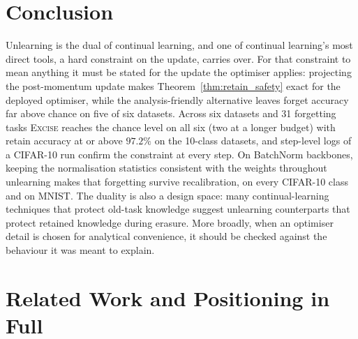 \documentclass{article}
\newcommand{\ours}{\textsc{Excise}}
\newcommand{\added}[1]{{\color{revised}#1}}
\newcommand{\rev}[1]{{\color{revisedB}#1}}
\theoremstyle{remark}
\theoremstyle{plain}
\begin{document}
\section{Conclusion}\label{sec:conclusion}

Unlearning is the dual of continual learning, and \rev{one of continual
learning's most direct tools, a hard constraint on the update, carries over}.
For that constraint to mean anything it must be stated for the update the
optimiser applies: projecting the post-momentum update makes
Theorem~\ref{thm:retain_safety} exact for the deployed optimiser, while the
analysis-friendly alternative \rev{leaves forget accuracy far above chance on
five of six datasets}. Across six datasets and 31 forgetting tasks \ours{}
reaches the chance level on all six (two at a longer budget) with retain
accuracy at or above $97.2\%$ on the 10-class datasets, and \rev{step-level logs
of a CIFAR-10 run} confirm the constraint at every step.
\added{On BatchNorm backbones, keeping the normalisation statistics consistent
with the weights throughout unlearning makes that forgetting survive
recalibration, on every CIFAR-10 class and on MNIST.} The duality is also a
design space: \rev{many continual-learning techniques that protect old-task
knowledge suggest unlearning counterparts} that protect retained knowledge
during erasure. More broadly, when an
optimiser detail is chosen for analytical convenience, it should be checked
against the behaviour it was meant to explain.

\FloatBarrier


\appendix
\section{Related Work and Positioning in Full}\label{app:related}\label{sec:related_intro}
\end{document}
